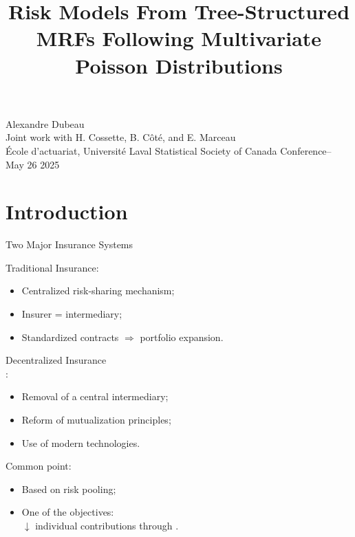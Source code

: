 \documentclass[11pt,xcolor={dvipsnames},hyperref={pdftex,pdfpagemode=UseNone,hidelinks,pdfdisplaydoctitle=true},usepdftitle=false]{beamer}
\begin{document}
\title{Risk Models From Tree-Structured MRFs Following Multivariate Poisson Distributions}


\information
%
%
{
\Large Alexandre Dubeau\\
\smallskip \large Joint work with H. Cossette, B. Côté, and E. Marceau\\
\normalsize École d'actuariat, Université Laval}
%
{Statistical Society of Canada Conference-- May 26 2025}

\frame{\titlepage}

\section{Introduction}
\begin{frame}{Two Major Insurance Systems}
\begin{minipage}[t]{0.45\textwidth}
{\large Traditional Insurance}:
\begin{itemize}
    \item Centralized risk-sharing mechanism;
    \item Insurer = intermediary;
    \item Standardized contracts $\Rightarrow$ portfolio expansion.
\end{itemize}
\end{minipage}
\hfill
\begin{minipage}[t]{0.45\textwidth}
{\large Decentralized Insurance}\\
\citep{feng2024unified}:
\begin{itemize}
    \item Removal of a central intermediary;
    \item Reform of mutualization principles;
    \item Use of modern technologies.
\end{itemize}
\end{minipage}
\pause

\vspace{5pt}

{\large Common point: }
\begin{itemize}
    \item Based on risk pooling;
    \item One of the objectives: \\
    $\downarrow$ individual contributions through .
\end{itemize}
\end{frame}
\end{document}
